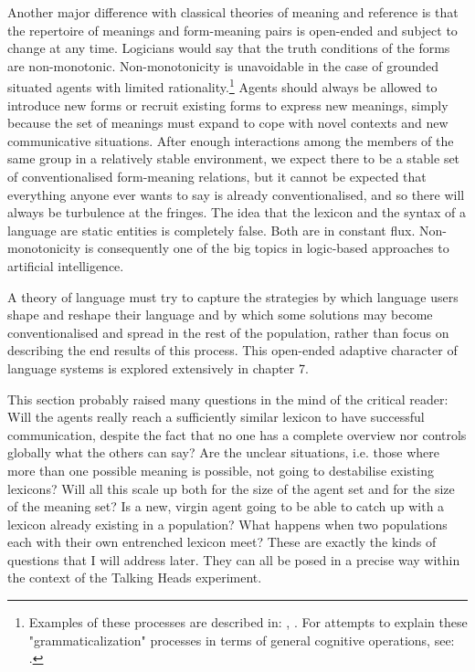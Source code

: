 Another major difference with classical theories of 
meaning and reference is 
that the repertoire of meanings and form-meaning pairs is open-ended
and subject to change at any time. Logicians would say that the 
truth conditions of the forms are non-monotonic. 
Non-monotonicity is unavoidable in the case of grounded 
situated agents with limited rationality.\footnote{
Examples of these processes are described in: 
\cite{Bybee:1994}, \cite{Traugott:1991}.
For attempts to explain these "grammaticalization" 
processes in terms of general cognitive operations, see: 
\cite{Heine:1997}.}
Agents should always be allowed to 
introduce new forms or recruit existing forms to express new
meanings, simply because the set of meanings must expand
to cope with novel contexts and new communicative
situations. After enough interactions among the 
members of the same group in a relatively stable 
environment, we expect there to be
a stable set of conventionalised form-meaning 
relations, but it cannot be
expected that everything anyone ever wants to say is
already conventionalised, and so there will always
be turbulence at the fringes. The idea that the lexicon
and the syntax of a language are static
entities is completely false. Both are in constant flux.
Non-monotonicity is consequently one of the big 
topics in logic-based approaches to artificial intelligence.

A theory of language must try 
to capture the strategies by which language users shape and 
reshape their language and by which some solutions may become 
conventionalised and spread in the rest of the population, 
rather than focus on describing the end results of 
this process. This open-ended adaptive character of 
language systems is explored extensively in chapter 7. 

This section probably raised many questions in the 
mind of the critical reader: Will the agents really 
reach a sufficiently similar lexicon to have successful 
communication, despite the fact that no one has a 
complete overview nor controls globally what the others
can say? Are the unclear situations, i.e. those
where more than one possible meaning is possible, not 
going to destabilise existing lexicons? Will all this 
scale up both for the size of the agent set and for 
the size of the meaning set? Is a new, virgin agent 
going to be able to catch up with a lexicon already 
existing in a population? What happens when two 
populations each with their own entrenched lexicon meet? 
These are exactly the kinds of questions that I will 
address later. They can all be posed in a precise 
way within the context of the Talking Heads experiment.

